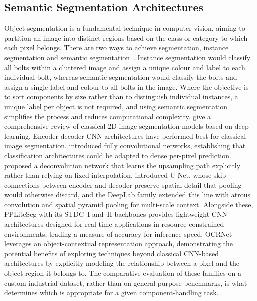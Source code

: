 \subsection{Semantic Segmentation Architectures}\label{subsec:lit_segmentation}

Object segmentation is a fundamental technique in computer vision, aiming to partition an image into
distinct regions based on the class or category to which each pixel belongs. There are two ways to
achieve segmentation, instance segmentation and semantic segmentation~\citep{yin2022bridging}.
Instance segmentation would classify all bolts within a cluttered image and assign a unique colour
and label to each individual bolt, whereas semantic segmentation would classify the bolts and assign
a single label and colour to all bolts in the image. Where the objective is to sort components by
size rather than to distinguish individual instances, a unique label per object is not required, and
using semantic segmentation simplifies the process and reduces computational
complexity. \citet{mo2022review} give a comprehensive review of classical 2D image segmentation models based on deep learning. Encoder-decoder CNN architectures have performed best for classical image segmentation. \citet{long2015fully} introduced fully convolutional networks, establishing that
classification architectures could be adapted to dense per-pixel prediction.
\citet{noh2015learning} proposed a deconvolution network that learns the upsampling path explicitly
rather than relying on fixed interpolation. \citet{ronneberger2015unet} introduced U-Net, whose skip
connections between encoder and decoder preserve spatial detail that pooling would otherwise
discard, and the DeepLab family extended this line with atrous convolution and spatial pyramid
pooling for multi-scale context. Alongside these, PPLiteSeg with its STDC~I and~II backbones provides lightweight CNN architectures designed for real-time applications in resource-constrained environments, trading a measure of accuracy for inference speed. OCRNet leverages an object-contextual representation approach, demonstrating the potential benefits of exploring techniques beyond classical CNN-based architectures by explicitly modeling the relationship between a pixel and the object region it belongs to. The comparative evaluation of these families on a custom
industrial dataset, rather than on general-purpose benchmarks, is what determines which is
appropriate for a given component-handling task.

